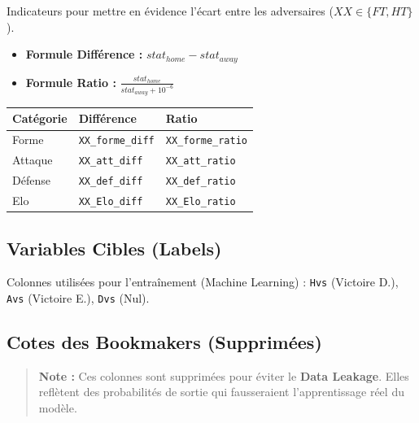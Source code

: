 Indicateurs pour mettre en évidence l'écart entre les adversaires 
($XX \in \{FT, HT\}$).

\begin{itemize}
    \item \textbf{Formule Différence :} $stat_{home} - stat_{away}$
    \item \textbf{Formule Ratio :} $\frac{stat_{home}}{stat_{away} + 10^{-6}}$
\end{itemize}

\begin{table}[h]
\centering
\begin{tabular}{|l|l|l|}
\hline
\textbf{Catégorie} & \textbf{Différence} & \textbf{Ratio} \\ \hline
Forme & \texttt{XX\_forme\_diff} & \texttt{XX\_forme\_ratio} \\ \hline
Attaque & \texttt{XX\_att\_diff} & \texttt{XX\_att\_ratio} \\ \hline
Défense & \texttt{XX\_def\_diff} & \texttt{XX\_def\_ratio} \\ \hline
Elo & \texttt{XX\_Elo\_diff} & \texttt{XX\_Elo\_ratio} \\ \hline
\end{tabular}
\end{table}

\subsection{Variables Cibles (Labels)}

Colonnes utilisées pour l'entraînement (Machine Learning) : \texttt{Hvs} 
(Victoire D.), \texttt{Avs} (Victoire E.), \texttt{Dvs} (Nul).

\subsection{Cotes des Bookmakers (Supprimées)}

\begin{quote}
    \textbf{Note :} Ces colonnes sont supprimées pour éviter le \textbf{Data Leakage}. 
    Elles reflètent des probabilités de sortie qui fausseraient l'apprentissage réel 
    du modèle.
\end{quote}
